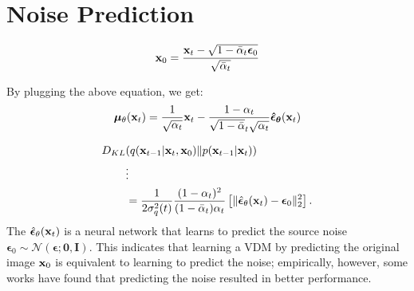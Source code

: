 \section{Noise Prediction}

\begin{align*}
	{\mathbf{x}}_0 = \frac{{\mathbf{x}}_t - \sqrt{1-\bar{\alpha}_t\boldsymbol{\epsilon}_0}}{\sqrt{\bar{\alpha}_t}}
\end{align*}

By plugging the above equation, we get:
\begin{align*}
	\boldsymbol{\mu}_\theta({\mathbf{x}}_t) = \frac{1}{\sqrt{\alpha_t}}{\mathbf{x}}_t - \frac{1-\alpha_t}{\sqrt{1-\bar{\alpha}}_t\sqrt{\alpha_t}}\boldsymbol{\hat{\epsilon}_\theta}({\mathbf{x}}_t)
\end{align*}

\begin{align*}
	D_{KL}&(q({\mathbf{x}}_{t-1}|{\mathbf{x}}_t, {\mathbf{x}}_0)\|p({\mathbf{x}}_{t-1}|{\mathbf{x}}_{t})) \\
																 & \vdots\\
																 &= \frac{1}{2\sigma^2_q(t)}\frac{(1-{\alpha}_{t})^2}{(1-\bar{\alpha}_{t})\alpha_t}\left[\|\hat{\boldsymbol{\epsilon}}_\theta({\mathbf{x}}_t)-\boldsymbol{\epsilon}_0\|^2_2\right].
\end{align*}
The $\hat{\boldsymbol{\epsilon}}_\theta({\mathbf{x}}_t)$ is a neural network that learns to predict the source noise $\boldsymbol{\epsilon}_0\sim \mathcal{N}(\boldsymbol{\epsilon}; \mathbf{0}, \mathbf{I})$. This indicates that learning a VDM by predicting the original image ${\mathbf{x}}_0$ is equivalent to learning to predict the noise; empirically, however, some works have found that predicting the noise resulted in better performance.
